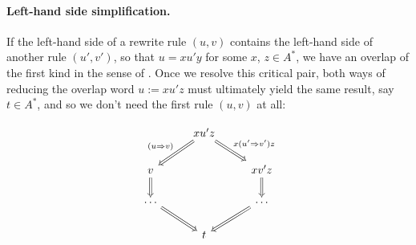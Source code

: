 \documentclass[../generics]{subfiles}
\begin{document}
\paragraph{Left-hand side simplification.} If the left-hand side of a rewrite rule $(u, v)$ contains the left-hand side of another rule $(u', v')$, so that $u=xu'y$ for some $x$, $z \in A^*$, we have an overlap of the first kind in the sense of . Once we resolve this critical pair, both ways of reducing the overlap word $u:=xu'z$ must ultimately yield the same result, say $t \in A^*$, and so we don't need the first rule $(u, v)$ at all:
\begin{ceqn}
\[
\begin{tikzcd}
&xu'z
\arrow[ld, Rightarrow, "(u\Red v)"']
\arrow[rd, Rightarrow, "x(u'\Red v')z"]
\\
v\arrow[d, Rightarrow]&&xv'z\arrow[d, Rightarrow]\\
\ldots\arrow[rd, Rightarrow]&&\ldots\arrow[ld, Rightarrow]\\
&t&
\end{tikzcd}
\]
\end{ceqn}
\end{document}
